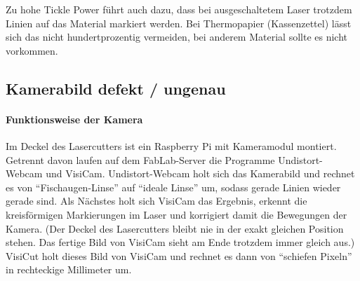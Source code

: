 \documentclass{\basedir/fablab-document}
\begin{document}
	Zu hohe Tickle Power führt auch dazu, dass bei ausgeschaltetem Laser trotzdem Linien auf das Material markiert werden. Bei Thermopapier (Kassenzettel) lässt sich das nicht hundertprozentig vermeiden, bei anderem Material sollte es nicht vorkommen.


	\subsection{Kamerabild defekt / ungenau}
	\label{sec:wartung-visicam}
	\paragraph{Funktionsweise der Kamera}
	Im Deckel des Lasercutters ist ein Raspberry Pi mit Kameramodul montiert. Getrennt davon laufen auf dem FabLab-Server die Programme Undistort-Webcam und VisiCam.
	Undistort-Webcam holt sich das Kamerabild und rechnet es von \enquote{Fischaugen-Linse} auf \enquote{ideale Linse} um, sodass gerade Linien wieder gerade sind. Als Nächstes holt sich VisiCam das Ergebnis, erkennt die kreisförmigen Markierungen im Laser und korrigiert damit die Bewegungen der Kamera. (Der Deckel des Lasercutters bleibt nie in der exakt gleichen Position stehen. Das fertige Bild von VisiCam sieht am Ende trotzdem immer gleich aus.)
	VisiCut holt dieses Bild von VisiCam und rechnet es dann von \enquote{schiefen Pixeln} in rechteckige Millimeter um.
\end{document}
